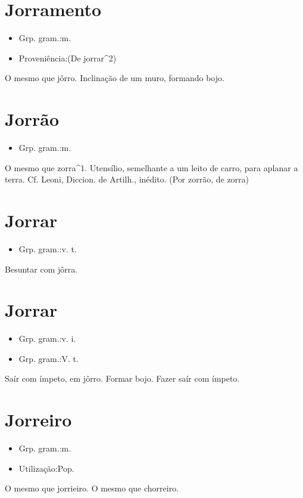 \documentclass{article}
\begin{document}
\section{Jorramento}
\begin{itemize}
\item {Grp. gram.:m.}
\end{itemize}
\begin{itemize}
\item {Proveniência:(De \textunderscore jorrar\textunderscore ^2)}
\end{itemize}
O mesmo que \textunderscore jôrro\textunderscore .
Inclinação de um muro, formando bojo.
\section{Jorrão}
\begin{itemize}
\item {Grp. gram.:m.}
\end{itemize}
O mesmo que \textunderscore zorra\textunderscore ^1.
Utensílio, semelhante a um leito de carro, para aplanar a terra. Cf. Leoni, \textunderscore Diccion. de Artilh.\textunderscore , inédito.
(Por \textunderscore zorrão\textunderscore , de \textunderscore zorra\textunderscore )
\section{Jorrar}
\begin{itemize}
\item {Grp. gram.:v. t.}
\end{itemize}
Besuntar com jôrra.
\section{Jorrar}
\begin{itemize}
\item {Grp. gram.:v. i.}
\end{itemize}
\begin{itemize}
\item {Grp. gram.:V. t.}
\end{itemize}
Saír com ímpeto, em jôrro.
Formar bojo.
Fazer saír com ímpeto.
\section{Jorreiro}
\begin{itemize}
\item {Grp. gram.:m.}
\end{itemize}
\begin{itemize}
\item {Utilização:Pop.}
\end{itemize}
O mesmo que \textunderscore jorrieiro\textunderscore .
O mesmo que \textunderscore chorreiro\textunderscore .
\end{document}
